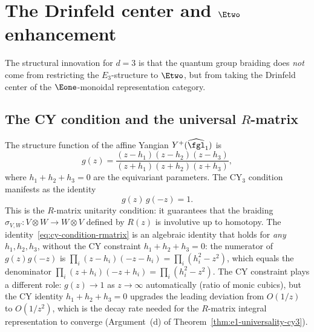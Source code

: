 \section{The Drinfeld center and \texorpdfstring{$\Etwo$}{E2} enhancement}
\label{sec:d3-drinfeld-center}

The structural innovation for $d = 3$ is that the quantum group braiding does \emph{not} come from restricting the $E_3$-structure to $\Etwo$, but from taking the Drinfeld center of the $\Eone$-monoidal representation category.

\subsection{The CY condition and the universal \texorpdfstring{$R$}{R}-matrix}
\label{subsec:cy-rmatrix}

The structure function of the affine Yangian $Y^+(\widehat{\fgl}_1)$ is
\begin{equation}
\label{eq:yangian-structure-function}
 g(z) = \frac{(z - h_1)(z - h_2)(z - h_3)}{(z + h_1)(z + h_2)(z + h_3)},
\end{equation}
where $h_1 + h_2 + h_3 = 0$ are the equivariant parameters. The CY$_3$ condition manifests as the identity
\begin{equation}
\label{eq:cy-condition-rmatrix}
 g(z) \, g(-z) = 1.
\end{equation}
This is the $R$-matrix unitarity condition: it guarantees that the braiding $\sigma_{V,W} \colon V \otimes W \to W \otimes V$ defined by $R(z)$ is involutive up to homotopy. The identity~\eqref{eq:cy-condition-rmatrix} is an algebraic identity that holds for \emph{any} $h_1, h_2, h_3$, without the CY constraint $h_1 + h_2 + h_3 = 0$: the numerator of $g(z)g(-z)$ is $\prod_i(z-h_i)(-z-h_i) = \prod_i(h_i^2 - z^2)$, which equals the denominator $\prod_i(z+h_i)(-z+h_i) = \prod_i(h_i^2 - z^2)$. The CY constraint plays a different role: $g(z) \to 1$ as $z \to \infty$ automatically (ratio of monic cubics), but the CY identity $h_1+h_2+h_3=0$ upgrades the leading deviation from $O(1/z)$ to $O(1/z^2)$, which is the decay rate needed for the $R$-matrix integral representation to converge (Argument~(d) of Theorem~\ref{thm:e1-universality-cy3}).

